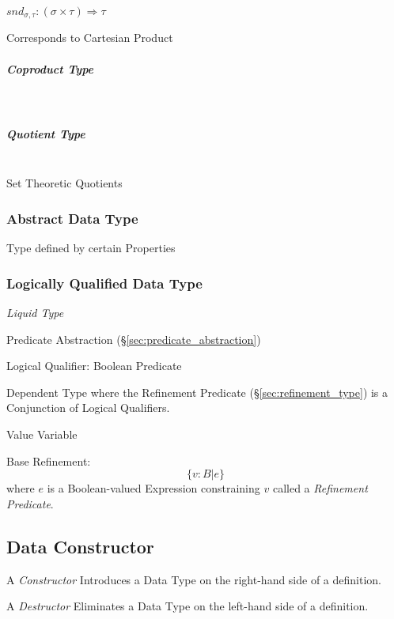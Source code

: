 $snd_{\sigma,\tau} : (\sigma \times \tau) \Rightarrow \tau$

Corresponds to Cartesian Product



\subparagraph{Coproduct Type}\label{sec:coproduct_type}
\hfill \\



\subparagraph{Quotient Type}\label{sec:quotient_type}
\hfill \\

Set Theoretic Quotients



\subsubsection{Abstract Data Type}\label{sec:abstract_datatype}

Type defined by certain Properties %



\subsubsection{Logically Qualified Data Type}
\label{sec:logically_qualified}\cite{rondon-kawaguchi-jhala08}

\emph{Liquid Type}

Predicate Abstraction (\S\ref{sec:predicate_abstraction})

Logical Qualifier: Boolean Predicate

Dependent Type where the Refinement Predicate
(\S\ref{sec:refinement_type}) is a Conjunction of Logical Qualifiers.

Value Variable

Base Refinement:
\[
  \{ v : B | e \}
\]
where $e$ is a Boolean-valued Expression constraining $v$ called a
\emph{Refinement Predicate}.



\subsection{Data Constructor}\label{sec:data_constructor}

A \emph{Constructor} Introduces a Data Type on the right-hand side of
a definition.

A \emph{Destructor} Eliminates a Data Type on the left-hand side of a
definition.

